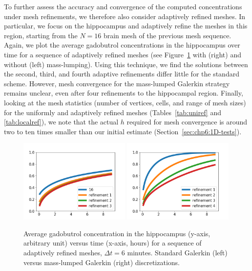 To further assess the accuracy and convergence of the computed
concentrations under mesh refinements, we therefore also consider
adaptively refined meshes. In particular, we focus on the hippocampus
and adaptively refine the meshes in this region, starting from the
$N=16$ brain mesh of the previous mesh sequence. Again, we plot the
average gadobutrol concentrations in the hippocampus over time for
a sequence of adaptively refined meshes (see
Figure~\ref{fig:chp6:numerics3} with (right) and without (left)
mass-lumping). Using this technique, we find the solutions between the second,
third, and fourth adaptive refinements differ little for the standard
scheme. However, mesh convergence for the mass-lumped Galerkin
strategy remains unclear, even after four refinements to the
hippocampal region. Finally, looking at the mesh statistics (number of
vertices, cells, and range of mesh sizes) for the uniformly and
adaptively refined meshes (Tables~\ref{tab:uniref} and
\ref{tab:localref}), we note that the actual $h$ required for mesh
convergence is around two to ten times smaller than our initial estimate
(Section~\ref{sec:chp6:1D-tests}).
\begin{figure}	
\includegraphics[width=0.49\textwidth]{./graphics/chp6/tracer_hippocampus_notlumped_addaptive.png}
\includegraphics[width=0.49\textwidth]{./graphics/chp6/tracer_hippocampus_lumped_addaptive.png}
  \caption{Average gadobutrol concentration in the hippocampus
    (y-axis, arbitrary unit) versus time (x-axis, hours) for a
    sequence of adaptively refined meshes, $\Delta t = 6$
    minutes. Standard Galerkin (left) versus mass-lumped Galerkin (right)
    discretizations.}
\label{fig:chp6:numerics3}
\end{figure}
